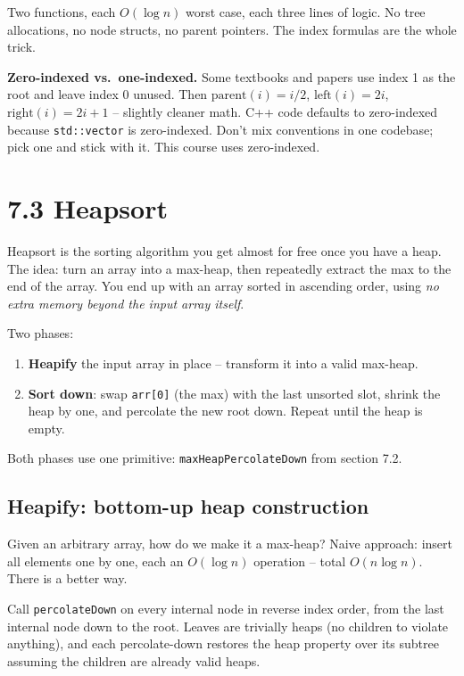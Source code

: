 \documentclass[11pt]{article}
\begin{document}
Two functions, each $O(\log n)$ worst case, each three lines of logic. No tree allocations, no node structs, no parent pointers. The index formulas are the whole trick.

\begin{notebox}
\textbf{Zero-indexed vs.\ one-indexed.} Some textbooks and papers use index 1 as the root and leave index 0 unused. Then $\text{parent}(i) = i/2$, $\text{left}(i) = 2i$, $\text{right}(i) = 2i + 1$ -- slightly cleaner math. C++ code defaults to zero-indexed because \texttt{std::vector} is zero-indexed. Don't mix conventions in one codebase; pick one and stick with it. This course uses zero-indexed.
\end{notebox}

\section{7.3 Heapsort}

Heapsort is the sorting algorithm you get almost for free once you have a heap. The idea: turn an array into a max-heap, then repeatedly extract the max to the end of the array. You end up with an array sorted in ascending order, using \emph{no extra memory beyond the input array itself}.

Two phases:
\begin{enumerate}[leftmargin=*]
    \item \textbf{Heapify} the input array in place -- transform it into a valid max-heap.
    \item \textbf{Sort down}: swap \texttt{arr[0]} (the max) with the last unsorted slot, shrink the heap by one, and percolate the new root down. Repeat until the heap is empty.
\end{enumerate}

Both phases use one primitive: \texttt{maxHeapPercolateDown} from section 7.2.

\subsection*{Heapify: bottom-up heap construction}

Given an arbitrary array, how do we make it a max-heap? Naive approach: insert all elements one by one, each an $O(\log n)$ operation -- total $O(n \log n)$. There is a better way.

\begin{defnbox}[Heapify]
Call \texttt{percolateDown} on every internal node in reverse index order, from the last internal node down to the root. Leaves are trivially heaps (no children to violate anything), and each percolate-down restores the heap property over its subtree assuming the children are already valid heaps.
\end{defnbox}
\end{document}
